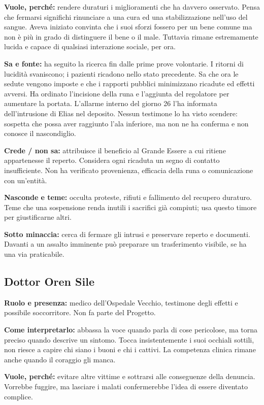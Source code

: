 \documentclass[11pt,a4paper]{article}
\begin{document}
\textbf{Vuole, perché:} rendere duraturi i miglioramenti che ha davvero osservato. Pensa che fermarsi significhi rinunciare a una cura ed una stabilizzazione nell'uso del sangue. Aveva iniziato convinta che i suoi sforzi fossero per un bene comune ma non è più in grado di distinguere il bene o il male. Tuttavia rimane estremamente lucida e capace di qualsiasi interazione sociale, per ora.

\textbf{Sa e fonte:} ha seguito la ricerca fin dalle prime prove volontarie. I ritorni di lucidità svaniscono; i pazienti ricadono nello stato precedente. Sa che ora le sedute vengono imposte e che i rapporti pubblici minimizzano ricadute ed effetti avversi. Ha ordinato l'incisione della runa e l'aggiunta del regolatore per aumentare la portata. L'allarme interno del giorno 26 l'ha informata dell'intrusione di Elias nel deposito. Nessun testimone lo ha visto scendere: sospetta che possa aver raggiunto l'ala inferiore, ma non ne ha conferma e non conosce il nascondiglio.

\textbf{Crede / non sa:} attribuisce il beneficio al Grande Essere a cui ritiene appartenesse il reperto. Considera ogni ricaduta un segno di contatto insufficiente. Non ha verificato provenienza, efficacia della runa o comunicazione con un'entità.

\textbf{Nasconde e teme:} occulta proteste, rifiuti e fallimento del recupero duraturo. Teme che una sospensione renda inutili i sacrifici già compiuti; usa questo timore per giustificarne altri.

\textbf{Sotto minaccia:} cerca di fermare gli intrusi e preservare reperto e documenti. Davanti a un assalto imminente può preparare un trasferimento visibile, se ha una via praticabile.

\subsection{Dottor Oren Sile}
\textbf{Ruolo e presenza:} medico dell'Ospedale Vecchio, testimone degli effetti e possibile soccorritore. Non fa parte del Progetto.\par
\textbf{Come interpretarlo:} abbassa la voce quando parla di cose pericolose, ma torna preciso quando descrive un sintomo. Tocca insistentemente i suoi occhiali sottili, non riesce a capire chi siano i buoni e chi i cattivi. La competenza clinica rimane anche quando il coraggio gli manca. 

\textbf{Vuole, perché:} evitare altre vittime e sottrarsi alle conseguenze della denuncia. Vorrebbe fuggire, ma lasciare i malati confermerebbe l'idea di essere diventato complice.
\end{document}
